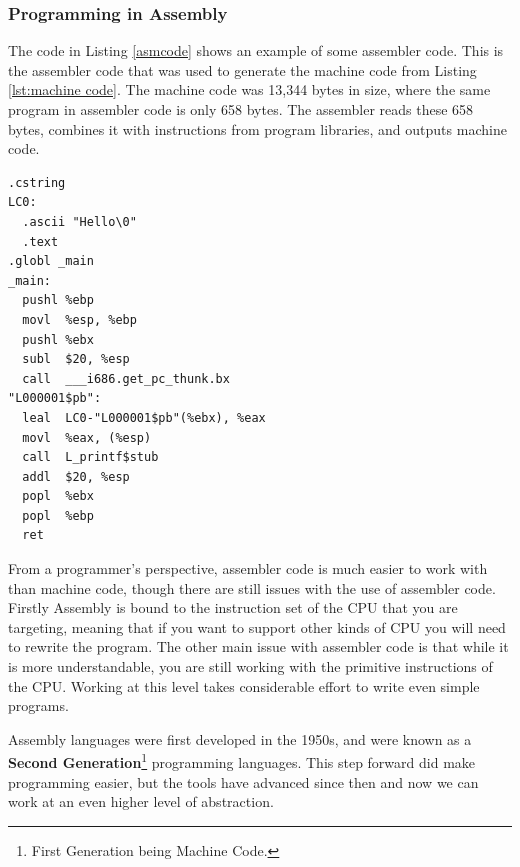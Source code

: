 \clearpage
\subsubsection{Programming in Assembly} %
\label{ssub:programming_in_assembly}

The code in Listing \vref{asmcode} shows an example of some assembler code. This is the assembler code that was used to generate the machine code from Listing \ref{lst:machine code}. The machine code was 13,344 bytes in size, where the same program in assembler code is only 658 bytes. The assembler reads these 658 bytes, combines it with instructions from program libraries, and outputs machine code. 

\begin{lstlisting}[caption={Assembler Sample},label={asmcode}]
  .cstring
LC0:
  .ascii "Hello\0"
  .text
.globl _main
_main:
  pushl	%ebp
  movl	%esp, %ebp
  pushl	%ebx
  subl	$20, %esp
  call	___i686.get_pc_thunk.bx 
"L000001$pb":
  leal	LC0-"L000001$pb"(%ebx), %eax
  movl	%eax, (%esp)
  call	L_printf$stub
  addl	$20, %esp
  popl	%ebx
  popl	%ebp
  ret
\end{lstlisting}

From a programmer's perspective, assembler code is much easier to work with than machine code, though there are still issues with the use of assembler code. Firstly Assembly is bound to the instruction set of the CPU that you are targeting, meaning that if you want to support other kinds of CPU you will need to rewrite the program. The other main issue with assembler code is that while it is more understandable, you are still working with the primitive instructions of the CPU. Working at this level takes considerable effort to write even simple programs.

Assembly languages were first developed in the 1950s, and were known as a \textbf{Second Generation}\footnote{First Generation being Machine Code.} programming languages. This step forward did make programming easier, but the tools have advanced since then and now we can work at an even higher level of abstraction.


